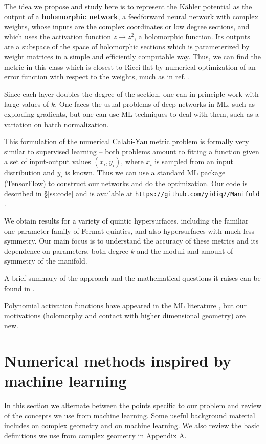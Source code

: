 \documentclass[12pt]{article}
\begin{document}
The idea we propose and study here is to 
represent the K\"ahler potential as the output of a {\bf holomorphic network}, a
feedforward neural network with complex weights, whose inputs are the complex coordinates
or low degree sections, and which uses the activation function $z\rightarrow z^2$, a holomorphic function.
Its outputs are a subspace of the space of holomorphic sections which is parameterized by weight matrices
in a simple and efficiently computable way.  Thus, we can find the metric in this class which is closest to Ricci flat
by numerical optimization of an error function with respect to the weights, much as in ref. \cite{Headrick:2009jz}.

Since each layer doubles the degree of the section, one can in principle work with large values of $k$.
One faces the usual problems of deep networks in ML, such as exploding gradients, but one can use ML
techniques to deal with them, such as a variation on batch normalization.

This formulation of the numerical Calabi-Yau metric problem 
is formally very similar to supervised learning -- both problems amount to fitting a function given
a set of input-output values $(x_i,y_i)$, where $x_i$ is sampled from an input distribution and $y_i$ is known.
Thus we can use a standard ML package (TensorFlow) to construct our networks and do the optimization.
Our code is described in \S \ref{ss:code} and is available at {\tt https://github.com/yidiq7/Manifold} .

We obtain results for a variety of quintic hypersurfaces, including the familiar
one-parameter family of Fermat quintics, and also hypersurfaces with much less symmetry.
Our main focus is to understand the accuracy of these metrics and its dependence on parameters,
both degree $k$ and the moduli and amount of symmetry of the manifold.

A brief summary of the approach and the mathematical questions it raises can be found in \cite{Douglas2020}.

Polynomial activation functions have appeared in the ML literature \cite{Chrysos2020,Mannelli2020},
but our motivations (holomorphy and contact with higher dimensional geometry) are new.  

\section{ Numerical methods inspired by machine learning }

In this section we alternate between the points specific to our problem and review of the concepts
we use from machine learning.  Some useful background material includes \cite{GH,Huybrechts} on
complex geometry and \cite{Bishop} on machine learning.  We also review the basic definitions we use from
complex geometry in Appendix A.
\end{document}
